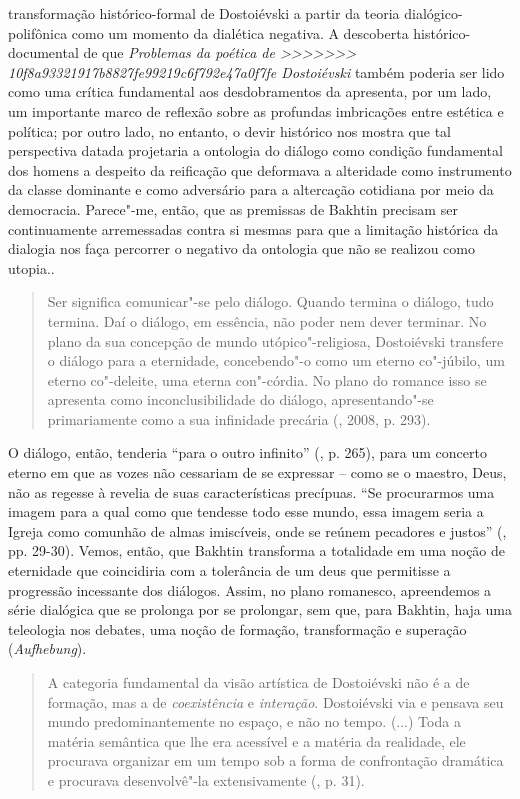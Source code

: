 {{{  transformação histórico-formal de Dostoiévski a partir da teoria
  dialógico-polifônica como um momento da dialética negativa. A
  descoberta histórico-documental de que \emph{Problemas da poética de
>>>>>>> 10f8a93321917b8827fe99219c6f792e47a0f7fe
  Dostoiévski} também poderia ser lido como uma crítica fundamental aos
  desdobramentos da  apresenta, por um lado, um importante marco de
  reflexão sobre as profundas imbricações entre estética e política; por
  outro lado, no entanto, o devir histórico nos mostra que tal
  perspectiva datada projetaria a ontologia do diálogo como condição
  fundamental dos homens a despeito da reificação que deformava a
  alteridade como instrumento da classe dominante e como adversário para
  a altercação cotidiana por meio da democracia. Parece"-me, então, que
  as premissas de Bakhtin precisam ser continuamente arremessadas contra
  si mesmas para que a limitação histórica da dialogia nos faça
  percorrer o negativo da ontologia que não se realizou como utopia.}.

\begin{quote}
Ser significa comunicar"-se pelo diálogo. Quando termina o diálogo, tudo
termina. Daí o diálogo, em essência, não poder nem dever terminar. No
plano da sua concepção de mundo utópico"-religiosa, Dostoiévski transfere
o diálogo para a eternidade, concebendo"-o como um eterno co"-júbilo, um
eterno co"-deleite, uma eterna con"-córdia. No plano do romance isso se
apresenta como inconclusibilidade do diálogo, apresentando"-se
primariamente como a sua infinidade precária (, 2008, p. 293).
\end{quote}

O diálogo, então, tenderia ``para o outro infinito'' (, p. 265),
para um concerto eterno em que as vozes não cessariam de se expressar --
como se o maestro, Deus, não as regesse à revelia de suas
características precípuas. ``Se procurarmos uma imagem para a qual como
que tendesse todo esse mundo, essa imagem seria a Igreja como comunhão
de almas imiscíveis, onde se reúnem pecadores e justos'' (, pp.
29-30). Vemos, então, que Bakhtin transforma a totalidade em uma noção
de eternidade que coincidiria com a tolerância de um deus que permitisse
a progressão incessante dos diálogos. Assim, no plano romanesco,
apreendemos a série dialógica que se prolonga por se prolongar, sem que,
para Bakhtin, haja uma teleologia nos debates, uma noção de formação,
transformação e superação (\emph{Aufhebung}).

\begin{quote}
A categoria fundamental da visão artística de Dostoiévski não é a de
formação, mas a de \emph{coexistência} e \emph{interação}. Dostoiévski
via e pensava seu mundo predominantemente no espaço, e não no tempo.
(...) Toda a matéria semântica que lhe era acessível e a matéria da
realidade, ele procurava organizar em um tempo sob a forma de
confrontação dramática e procurava desenvolvê"-la extensivamente (,
p. 31).
\end{quote}

}}
